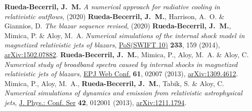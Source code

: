 \renewcommand{\refname}{Proceedings}
\setcounter{num}{0}
\renewcommand{\MyNbOfPub}{5}%
\renewcommand*{\bibliographyitemlabel}{\arabic{enumiv}.}
\begin{thebibliography}{99}
   \textbf{Rueda-Becerril, J.~M.} \emph{A numerical approach for radiative cooling in relativistic outflows}, %
  (2020)%
   \textbf{Rueda-Becerril, J.~M.}, Harrison, A.~O. \& Giannios, D. \emph{The blazar sequence revised}, %
  (2020)%
   \textbf{Rueda-Becerril, J.~M.}, Mimica, P. \& Aloy, M.~A. \emph{Numerical simulations of the internal shock model in magnetized relativistic jets of blazars}, \href{https://doi.org/10.22323/1.233.0159}{PoS(SWIFT 10)} \textbf{233}, 159 (2014), \href{https://arxiv.org/abs/1502.07882}{arXiv:1502.07882}.
   \textbf{Rueda-Becerril, J.~M.}, Mimica, P., Aloy, M.~A. \& Aloy, C. \emph{Numerical study of broadband spectra caused by internal shocks in magnetized relativistic jets of blazars}, \href{https://doi.org/10.1051/epjconf/20136102007}{EPJ Web Conf.} \textbf{61}, 02007 (2013), \href{https://arxiv.org/abs/1309.4612}{arXiv:1309.4612}.
   Mimica, P., Aloy, M.~A., \textbf{Rueda-Becerril, J.~M.}, Tabik, S. \& Aloy, C. \emph{Numerical simulations of dynamics and emission from relativistic astrophysical jets}, \href{https://doi.org/10.1088/1742-6596/454/1/012001}{J. Phys.: Conf. Ser} \textbf{42}, 012001 (2013), \href{https://arxiv.org/abs/1211.1794}{arXiv:1211.1794}.
\end{thebibliography}





%

